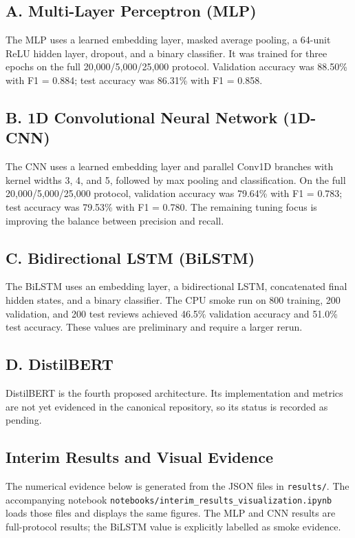 \documentclass[10pt,a4paper]{article}
\begin{document}
\subsection*{A. Multi-Layer Perceptron (MLP)}
The MLP uses a learned embedding layer, masked average pooling, a 64-unit ReLU hidden layer, dropout, and a binary classifier. It was trained for three epochs on the full 20,000/5,000/25,000 protocol. Validation accuracy was 88.50\% with F1 = 0.884; test accuracy was 86.31\% with F1 = 0.858.

\subsection*{B. 1D Convolutional Neural Network (1D-CNN)}
The CNN uses a learned embedding layer and parallel Conv1D branches with kernel widths 3, 4, and 5, followed by max pooling and classification. On the full 20,000/5,000/25,000 protocol, validation accuracy was 79.64\% with F1 = 0.783; test accuracy was 79.53\% with F1 = 0.780. The remaining tuning focus is improving the balance between precision and recall.

\subsection*{C. Bidirectional LSTM (BiLSTM)}
The BiLSTM uses an embedding layer, a bidirectional LSTM, concatenated final hidden states, and a binary classifier. The CPU smoke run on 800 training, 200 validation, and 200 test reviews achieved 46.5\% validation accuracy and 51.0\% test accuracy. These values are preliminary and require a larger rerun.

\subsection*{D. DistilBERT}
DistilBERT is the fourth proposed architecture. Its implementation and metrics are not yet evidenced in the canonical repository, so its status is recorded as pending.

\subsection*{Interim Results and Visual Evidence}
The numerical evidence below is generated from the JSON files in \texttt{results/}. The accompanying notebook \texttt{notebooks/interim\_results\_visualization.ipynb} loads those files and displays the same figures. The MLP and CNN results are full-protocol results; the BiLSTM value is explicitly labelled as smoke evidence.
\end{document}

